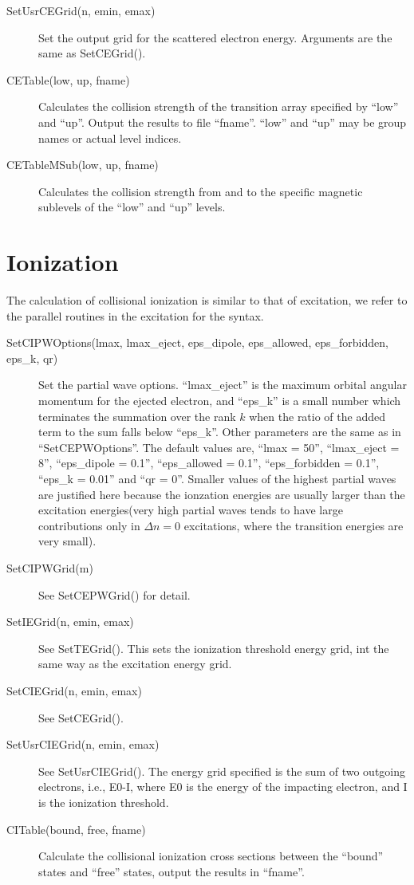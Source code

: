 \documentclass[12pt]{article}
\begin{document}
\begin{description}
\item[SetUsrCEGrid(n, emin, emax)]
Set the output grid for the scattered electron energy. Arguments are the same
as SetCEGrid().

\item[CETable(low, up, fname)] Calculates the collision strength of the
transition array specified by ``low'' and ``up''. Output the results to file
``fname''. ``low'' and ``up'' may be group names or actual level indices.

\item[CETableMSub(low, up, fname)] Calculates the collision strength from and
to the specific magnetic sublevels of the ``low'' and ``up'' levels.

\end{description}

\section{Ionization}
The calculation of collisional ionization is similar to that of excitation, we
refer to the parallel routines in the excitation for the syntax.
\begin{description}
\item[SetCIPWOptions(lmax, lmax\_eject, eps\_dipole, eps\_allowed,
eps\_forbidden, eps\_k, qr)]
Set the partial wave options. ``lmax\_eject'' is the maximum
orbital angular momentum for the ejected electron, and ``eps\_k'' is a
small number which terminates the summation over the rank $k$ when the ratio
of the added term to the sum falls below ``eps\_k''. Other parameters are the
same as in ``SetCEPWOptions''. The default values are,
``lmax = 50'', ``lmax\_eject = 8'', ``eps\_dipole = 0.1'', ``eps\_allowed =
0.1'', ``eps\_forbidden = 0.1'', ``eps\_k = 0.01'' and ``qr = 0''. Smaller
values of the highest partial waves are justified 
here because the ionzation energies are usually larger than the excitation
energies(very high partial waves tends to have large contributions only in
$\Delta n = 0$ excitations, where the transition energies are very small).

\item[SetCIPWGrid(m)]
See SetCEPWGrid() for detail.

\item[SetIEGrid(n, emin, emax)]
See SetTEGrid(). This sets the ionization threshold energy grid, int the same
way as the excitation energy grid.

\item[SetCIEGrid(n, emin, emax)]
See SetCEGrid().

\item[SetUsrCIEGrid(n, emin, emax)]
See SetUsrCIEGrid(). The energy grid specified is the sum of two outgoing
electrons, i.e., E0-I, where E0 is the energy of the impacting electron, and I
is the ionization threshold.

\item[CITable(bound, free, fname)] 
Calculate the collisional ionization cross sections between the ``bound''
states and ``free'' states, output the results in ``fname''.
\end{description}
\end{document}
